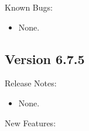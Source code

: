 \noindent Known Bugs:

\begin{itemize}

\item None.

\end{itemize}


\subsection*{\label{sec:New-6-7-5}Version 6.7.5}
\noindent Release Notes:

\begin{itemize}

\item None.

\end{itemize}


\noindent New Features:

